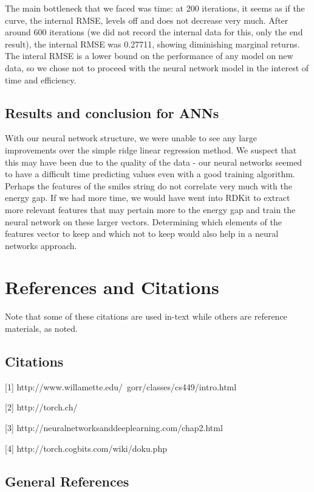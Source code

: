 \documentclass{article}
\begin{document}
The main bottleneck that we faced was time: at 200 iterations, it seems
as if the curve, the internal RMSE, levels off and does not
decrease very much.  After around 600 iterations (we did not
record the internal data for this, only the end result),
the internal RMSE was 0.27711, showing diminishing marginal
returns.  The interal RMSE is a lower
bound on the performance of any model on new data, so we chose
not to proceed with the neural network model in the interest
of time and efficiency.

\subsection{Results and conclusion for ANNs}
With our neural network structure, we were unable to see any large 
improvements over the simple ridge linear regression method.  
We suspect
 that this may have been due to the quality of the data 
 - our neural networks seemed to 
 have a difficult time predicting values even with a good training
 algorithm.  Perhaps the features of the smiles string do not correlate
 very much with the energy gap.  If we had more time, we would have
 went into RDKit to extract more relevant features that may pertain more
 to the energy gap and train the neural network on these larger
 vectors.  Determining which elements of the features vector
 to keep and which not to keep would also help in a neural networks approach.

\section{References and Citations}

Note that some of these citations are used in-text while
others are reference materials, as noted.

\subsection{Citations}

\begin{description}
  \item{[1]} http://www.willamette.edu/~gorr/classes/cs449/intro.html
  \item{[2]} http://torch.ch/
  \item{[3]} http://neuralnetworksanddeeplearning.com/chap2.html
  \item{[4]} http://torch.cogbits.com/wiki/doku.php

\end{description}

\subsection{General References}
\end{document}

